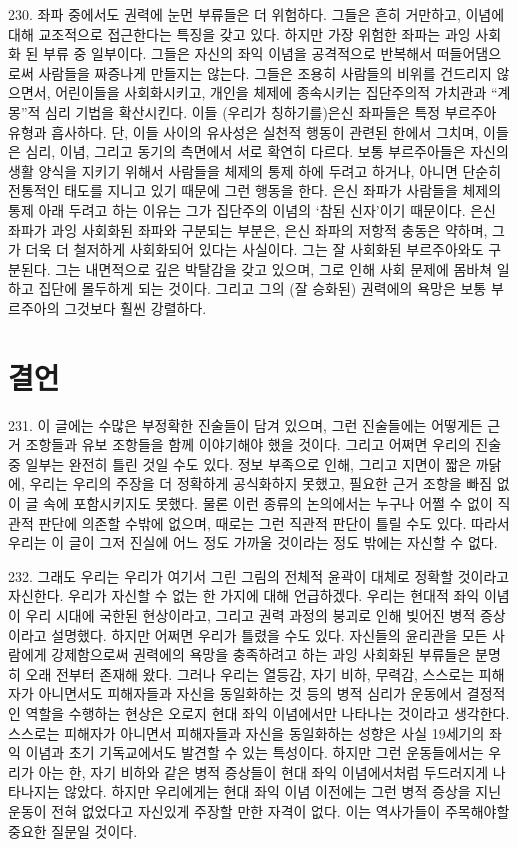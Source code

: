 \documentclass[11pt,a4paper]{article}
\begin{document}
\begin{multicols}{2}
230. 좌파 중에서도 권력에 눈먼 부류들은 더 위험하다. 그들은 흔히 거만하고, 이념에 대해 교조적으로  접근한다는 특징을 갖고 있다. 하지만 가장 위험한 좌파는 과잉 사회화 된 부류 중 일부이다. 그들은  자신의 좌익 이념을 공격적으로 반복해서 떠들어댐으로써 사람들을 짜증나게 만들지는 않는다. 그들은  조용히 사람들의 비위를 건드리지 않으면서, 어린이들을 사회화시키고, 개인을 체제에 종속시키는  집단주의적 가치관과 “계몽”적 심리 기법을 확산시킨다. 이들 (우리가 칭하기를)은신 좌파들은 특정  부르주아 유형과 흡사하다. 단, 이들 사이의 유사성은 실천적 행동이 관련된 한에서 그치며, 이들은 심리,  이념, 그리고 동기의 측면에서 서로 확연히 다르다. 보통 부르주아들은 자신의 생활 양식을 지키기 위해서 사람들을 체제의 통제 하에 두려고 하거나, 아니면 단순히 전통적인 태도를 지니고 있기 때문에 그런  행동을 한다. 은신 좌파가 사람들을 체제의 통제 아래 두려고 하는 이유는 그가 집단주의 이념의 ‘참된 신자’이기 때문이다. 은신 좌파가 과잉 사회화된 좌파와 구분되는 부분은, 은신 좌파의 저항적 충동은  약하며, 그가 더욱 더 철저하게 사회화되어 있다는 사실이다. 그는 잘 사회화된 부르주아와도 구분된다.  그는 내면적으로 깊은 박탈감을 갖고 있으며, 그로 인해 사회 문제에 몸바쳐 일하고 집단에 몰두하게 되는 것이다. 그리고 그의 (잘 승화된) 권력에의 욕망은 보통 부르주아의 그것보다 훨씬 강렬하다.  


\section*{결언} 
231. 이 글에는 수많은 부정확한 진술들이 담겨 있으며, 그런 진술들에는 어떻게든 근거 조항들과 유보  조항들을 함께 이야기해야 했을 것이다. 그리고 어쩌면 우리의 진술 중 일부는 완전히 틀린 것일 수도  있다. 정보 부족으로 인해, 그리고 지면이 짧은 까닭에, 우리는 우리의 주장을 더 정확하게 공식화하지  못했고, 필요한 근거 조항을 빠짐 없이 글 속에 포함시키지도 못했다. 물론 이런 종류의 논의에서는  누구나 어쩔 수 없이 직관적 판단에 의존할 수밖에 없으며, 때로는 그런 직관적 판단이 틀릴 수도 있다.  따라서 우리는 이 글이 그저 진실에 어느 정도 가까울 것이라는 정도 밖에는 자신할 수 없다. 


232. 그래도 우리는 우리가 여기서 그린 그림의 전체적 윤곽이 대체로 정확할 것이라고 자신한다. 우리가 자신할 수 없는 한 가지에 대해 언급하겠다. 우리는 현대적 좌익 이념이 우리 시대에 국한된 현상이라고,  그리고 권력 과정의 붕괴로 인해 빚어진 병적 증상이라고 설명했다. 하지만 어쩌면 우리가 틀렸을 수도  있다. 자신들의 윤리관을 모든 사람에게 강제함으로써 권력에의 욕망을 충족하려고 하는 과잉 사회화된 부류들은 분명히 오래 전부터 존재해 왔다. 그러나 우리는 열등감, 자기 비하, 무력감, 스스로는 피해자가  아니면서도 피해자들과 자신을 동일화하는 것 등의 병적 심리가 운동에서 결정적인 역할을 수행하는  현상은 오로지 현대 좌익 이념에서만 나타나는 것이라고 생각한다. 스스로는 피해자가 아니면서  피해자들과 자신을 동일화하는 성향은 사실 19세기의 좌익 이념과 초기 기독교에서도 발견할 수 있는  특성이다. 하지만 그런 운동들에서는 우리가 아는 한, 자기 비하와 같은 병적 증상들이 현대 좌익 이념에서처럼 두드러지게 나타나지는 않았다. 하지만 우리에게는 현대 좌익 이념 이전에는 그런 병적 
증상을 지닌 운동이 전혀 없었다고 자신있게 주장할 만한 자격이 없다. 이는 역사가들이 주목해야할  중요한 질문일 것이다. 



\end{multicols}
\end{document}
